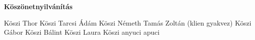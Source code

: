 
\thispagestyle{empty}

\vspace*{\fill}

{\bf \huge {Köszönetnyilvánítás}}

\vspace*{\fill}

Köszi Thor
Köszi Tarcsi Ádám
Köszi Németh Tamás Zoltán (klien gyakvez)
Köszi Gábor
Köszi Bálint
Köszi Laura
Köszi anyuci apuci

\vspace*{\fill}
\setcounter{page}{1}
